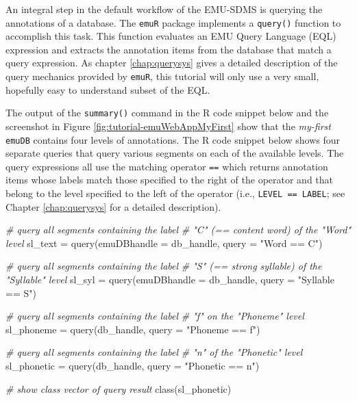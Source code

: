 \documentclass[
]{book}
\newenvironment{Shaded}{\begin{snugshade}}{\end{snugshade}}
\newcommand{\AttributeTok}[1]{\textcolor[rgb]{0.77,0.63,0.00}{#1}}
\newcommand{\CommentTok}[1]{\textcolor[rgb]{0.56,0.35,0.01}{\textit{#1}}}
\newcommand{\FunctionTok}[1]{\textcolor[rgb]{0.00,0.00,0.00}{#1}}
\newcommand{\NormalTok}[1]{#1}
\newcommand{\OtherTok}[1]{\textcolor[rgb]{0.56,0.35,0.01}{#1}}
\newcommand{\StringTok}[1]{\textcolor[rgb]{0.31,0.60,0.02}{#1}}
\begin{document}
An integral step in the default workflow of the EMU-SDMS is querying the annotations of a database. The \texttt{emuR} package implements a \texttt{query()} function to accomplish this task. This function evaluates an EMU Query Language (EQL) expression and extracts the annotation items from the database that match a query expression. As chapter \ref{chap:querysys} gives a detailed description of the query mechanics provided by \texttt{emuR}, this tutorial will only use a very small, hopefully easy to understand subset of the EQL.

The output of the \texttt{summary()} command in the R code snippet below and the screenshot in Figure \ref{fig:tutorial-emuWebAppMyFirst} show that the \emph{my-first} \texttt{emuDB} contains four levels of annotations. The R code snippet below shows four separate queries that query various segments on each of the available levels. The query expressions all use the matching operator \texttt{==} which returns annotation items whose labels match those specified to the right of the operator and that belong to the level specified to the left of the operator (i.e., \texttt{LEVEL\ ==\ LABEL}; see Chapter \ref{chap:querysys} for a detailed description).

\begin{Shaded}
\begin{Highlighting}[]
\CommentTok{\# query all segments containing the label}
\CommentTok{\# "C" (== content word) of the "Word" level}
\NormalTok{sl\_text }\OtherTok{=} \FunctionTok{query}\NormalTok{(}\AttributeTok{emuDBhandle =}\NormalTok{ db\_handle,}
                \AttributeTok{query =} \StringTok{"Word == C"}\NormalTok{)}

\CommentTok{\# query all segments containing the label}
\CommentTok{\# "S" (== strong syllable) of the "Syllable" level}
\NormalTok{sl\_syl }\OtherTok{=} \FunctionTok{query}\NormalTok{(}\AttributeTok{emuDBhandle =}\NormalTok{ db\_handle,}
               \AttributeTok{query =} \StringTok{"Syllable == S"}\NormalTok{)}

\CommentTok{\# query all segments containing the label}
\CommentTok{\# "f" on the "Phoneme" level}
\NormalTok{sl\_phoneme }\OtherTok{=} \FunctionTok{query}\NormalTok{(db\_handle,}
                   \AttributeTok{query =} \StringTok{"Phoneme == f"}\NormalTok{)}

\CommentTok{\# query all segments containing the label}
\CommentTok{\# "n" of the "Phonetic" level}
\NormalTok{sl\_phonetic }\OtherTok{=} \FunctionTok{query}\NormalTok{(db\_handle,}
                    \AttributeTok{query =} \StringTok{"Phonetic == n"}\NormalTok{)}

\CommentTok{\# show class vector of query result}
\FunctionTok{class}\NormalTok{(sl\_phonetic)}
\end{Highlighting}
\end{Shaded}
\end{document}
